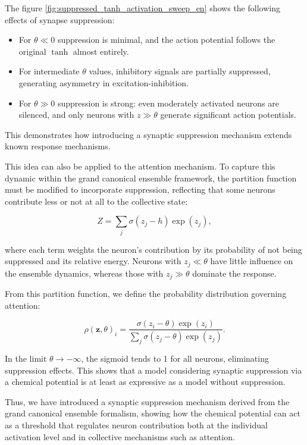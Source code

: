 \documentclass[12pt]{article}
\begin{document}
The figure \ref{fig:suppressed_tanh_activation_sweep_en} shows the following effects of synapse suppression:

\begin{itemize}
  \item For $\theta \ll 0$ suppression is minimal, and the action potential follows the original $\tanh$ almost entirely.
  \item For intermediate $\theta$ values, inhibitory signals are partially suppressed, generating asymmetry in excitation-inhibition.
  \item For $\theta \gg 0$ suppression is strong: even moderately activated neurons are silenced, and only neurons with $z \gg \theta$ generate significant action potentials.
\end{itemize}
This demonstrates how introducing a synaptic suppression mechanism extends known response mechanisms.

This idea can also be applied to the attention mechanism. To capture this dynamic within the grand canonical ensemble framework, the partition function must be modified to incorporate suppression, reflecting that some neurons contribute less or not at all to the collective state:

\begin{equation}
Z = \sum_j \sigma(z_j-h) \exp(z_j),
\end{equation}

where each term weights the neuron’s contribution by its probability of not being suppressed and its relative energy. Neurons with $z_j \ll \theta$ have little influence on the ensemble dynamics, whereas those with $z_j \gg \theta$ dominate the response.

From this partition function, we define the probability distribution governing attention:

\begin{equation}
\rho(\mathbf{z}, \theta)_i =\frac{ \sigma(z_i- \theta) \exp(z_i)}{\sum_j \sigma(z_j-\theta) \exp(z_j)}.
\end{equation}

In the limit $\theta \to -\infty$, the sigmoid tends to 1 for all neurons, eliminating suppression effects. This shows that a model considering synaptic suppression via a chemical potential is at least as expressive as a model without suppression.

Thus, we have introduced a synaptic suppression mechanism derived from the grand canonical ensemble formalism, showing how the chemical potential can act as a threshold that regulates neuron contribution both at the individual activation level and in collective mechanisms such as attention.
\end{document}
